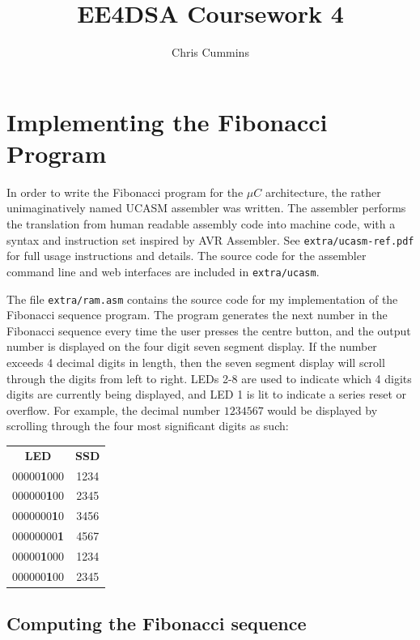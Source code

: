 \documentclass[12pt,a4paper]{article}
\title{EE4DSA Coursework 4}
\author{Chris Cummins}
\begin{document}
\maketitle

\section{Implementing the Fibonacci Program}

In order to write the Fibonacci program for the $\mu C$ architecture,
the rather unimaginatively named UCASM assembler was written. The
assembler performs the translation from human readable assembly code
into machine code, with a syntax and instruction set inspired by AVR
Assembler. See \texttt{extra/ucasm-ref.pdf} for full usage
instructions and details. The source code for the assembler command
line and web interfaces are included in \texttt{extra/ucasm}.

The file \texttt{extra/ram.asm} contains the source code for my
implementation of the Fibonacci sequence program. The program
generates the next number in the Fibonacci sequence every time the
user presses the centre button, and the output number is displayed on
the four digit seven segment display. If the number exceeds 4 decimal
digits in length, then the seven segment display will scroll through
the digits from left to right. LEDs 2-8 are used to indicate which 4
digits digits are currently being displayed, and LED 1 is lit to
indicate a series reset or overflow. For example, the decimal number
$1234567$ would be displayed by scrolling through the four most
significant digits as such:

\begin{table}[H]
  \centering
  \begin{tabular}{ c c }
    \textbf{LED} & \textbf{SSD} \\
    00000\textbf{1}000 & 1234 \\
    000000\textbf{1}00 & 2345 \\
    0000000\textbf{1}0 & 3456 \\
    00000000\textbf{1} & 4567 \\
    00000\textbf{1}000 & 1234 \\
    000000\textbf{1}00 & 2345 \\
  \end{tabular}
\end{table}

\subsection{Computing the Fibonacci sequence}
\end{document}
